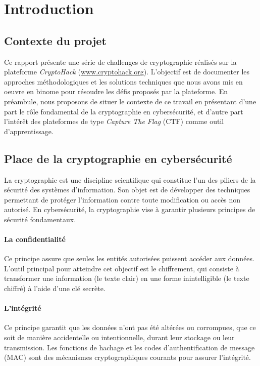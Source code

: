 \section{Introduction}

\subsection{Contexte du projet}
Ce rapport présente une série de challenges de cryptographie réalisés sur la
plateforme \textit{CryptoHack} (\href{www.cryptohack.org}{www.cryptohack.org}). L'objectif est de 
documenter les approches méthodologiques et les solutions techniques que nous avons mis en oeuvre en
binome pour résoudre les défis proposés par la plateforme. En préambule, nous proposons de situer
le contexte de ce travail en présentant d'une part le rôle fondamental de la
cryptographie en cybersécurité, et d'autre part l'intérêt des plateformes de
type \textit{Capture The Flag} (CTF) comme outil d'apprentissage.

\subsection{Place de la cryptographie en cybersécurité}
La cryptographie est une discipline scientifique qui constitue l'un des
piliers de la sécurité des systèmes d'information. Son objet est de
développer des techniques permettant de protéger l'information contre toute
modification ou accès non autorisé. En cybersécurité, la cryptographie vise
à garantir plusieurs principes de sécurité fondamentaux.

\paragraph{La confidentialité}
Ce principe assure que seules les entités autorisées puissent accéder aux
données. L'outil principal pour atteindre cet objectif est le chiffrement,
qui consiste à transformer une information (le texte clair) en une forme
inintelligible (le texte chiffré) à l'aide d'une clé secrète.

\paragraph{L'intégrité}
Ce principe garantit que les données n'ont pas été altérées ou corrompues,
que ce soit de manière accidentelle ou intentionnelle, durant leur stockage
ou leur transmission. Les fonctions de hachage et les codes
d'authentification de message (MAC) sont des mécanismes cryptographiques
courants pour assurer l'intégrité.

